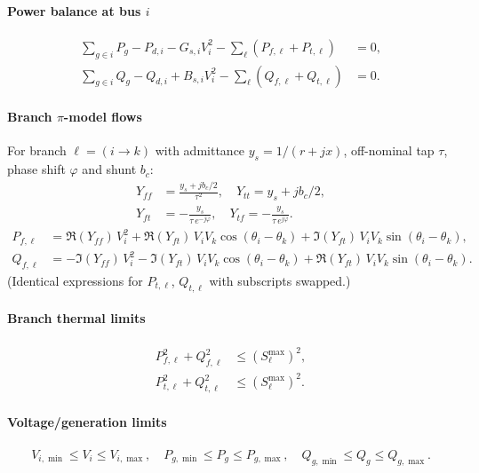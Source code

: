 \paragraph{Power balance at bus $i$}
\begin{align}
\sum_{g\in i} P_g - P_{d,i} - G_{s,i}V_i^2 - \sum_\ell (P_{f,\ell}+P_{t,\ell}) &= 0, \\
\sum_{g\in i} Q_g - Q_{d,i} + B_{s,i}V_i^2 - \sum_\ell (Q_{f,\ell}+Q_{t,\ell}) &= 0.
\end{align}

\paragraph{Branch $\pi$-model flows}

For branch $\ell = (i \to k)$ with admittance $y_s = 1/(r+jx)$,
off-nominal tap $\tau$, phase shift $\varphi$ and shunt $b_c$:
\begin{align}
Y_{ff} &= \tfrac{y_s + jb_c/2}{\tau^2},\quad
Y_{tt} = y_s + jb_c/2, \\
Y_{ft} &= -\tfrac{y_s}{\tau\,e^{-j\varphi}},\quad
Y_{tf} = -\tfrac{y_s}{\tau\,e^{j\varphi}}.
\end{align}
\begin{align}
P_{f,\ell} &= \Re(Y_{ff})\,V_i^2 + \Re(Y_{ft})\,V_i V_k\cos(\theta_i-\theta_k) + \Im(Y_{ft})\,V_i V_k\sin(\theta_i-\theta_k), \\
Q_{f,\ell} &= -\Im(Y_{ff})\,V_i^2 - \Im(Y_{ft})\,V_i V_k\cos(\theta_i-\theta_k) + \Re(Y_{ft})\,V_i V_k\sin(\theta_i-\theta_k).
\end{align}
(Identical expressions for $P_{t,\ell}$, $Q_{t,\ell}$ with subscripts swapped.)

\paragraph{Branch thermal limits}
\begin{align}
P_{f,\ell}^2 + Q_{f,\ell}^2 &\le (S_{\ell}^{\max})^2, \\
P_{t,\ell}^2 + Q_{t,\ell}^2 &\le (S_{\ell}^{\max})^2.
\end{align}

\paragraph{Voltage/generation limits}
\begin{align}
V_{i,\min} \le V_i \le V_{i,\max},\quad
P_{g,\min} \le P_g \le P_{g,\max},\quad
Q_{g,\min} \le Q_g \le Q_{g,\max}.
\end{align}

